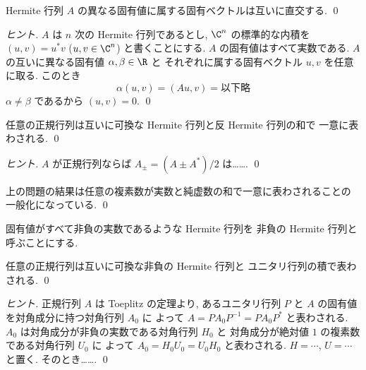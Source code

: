 \documentclass[12pt,twoside]{jarticle}
\begin{document}

\begin{question}[5点]
  Hermite 行列 $A$ の異なる固有値に属する固有ベクトルは互いに直交する.  \qed
\end{question}

\begin{proof}[ヒント]
  $A$ は $n$ 次の Hermite 行列であるとし, 
  $\C^n$ の標準的な内積を $(u,v)=u^*v$ ($u,v\in\C^n$) と書くことにする.
  $A$ の固有値はすべて実数である.
  $A$ の互いに異なる固有値 $\alpha,\beta\in\R$ と
  それぞれに属する固有ベクトル $u,v$ を任意に取る.
  このとき
  \begin{equation*}
    \alpha(u,v)=(Au,v)=\text{以下略}
  \end{equation*}
  $\alpha\ne\beta$ であるから $(u,v)=0$. \qed
\end{proof}


\begin{question}[5点]
  任意の正規行列は互いに可換な Hermite 行列と反 Hermite 行列の和で
  一意に表わされる.
  \qed
\end{question}

\begin{proof}[ヒント]
  $A$ が正規行列ならば $A_{\pm}=(A\pm A^*)/2$ は…….
  \qed
\end{proof}

\begin{guide}
  上の問題の結果は任意の複素数が実数と純虚数の和で一意に表わされることの
  一般化になっている. \qed
\end{guide}


固有値がすべて非負の実数であるような Hermite 行列を
非負の Hermite 行列と呼ぶことにする.

\begin{question}[5点]
  任意の正規行列は互いに可換な非負の Hermite 行列と
  ユニタリ行列の積で表わされる.
  \qed
\end{question}

\begin{proof}[ヒント]
  正規行列 $A$ は Toeplitz の定理より, あるユニタリ行列 $P$ 
  と $A$ の固有値を対角成分に持つ対角行列 $A_0$ に
  よって $A=PA_0P^{-1}=PA_0P^*$ と表わされる.
  $A_0$ は対角成分が非負の実数である対角行列 $H_0$ と
  対角成分が絶対値 $1$ の複素数である対角行列 $U_0$ に
  よって $A_0=H_0U_0=U_0H_0$ と表わされる.
  $H=\cdots$, $U=\cdots$ と置く. そのとき…….
  \qed
\end{proof}
\end{document}
